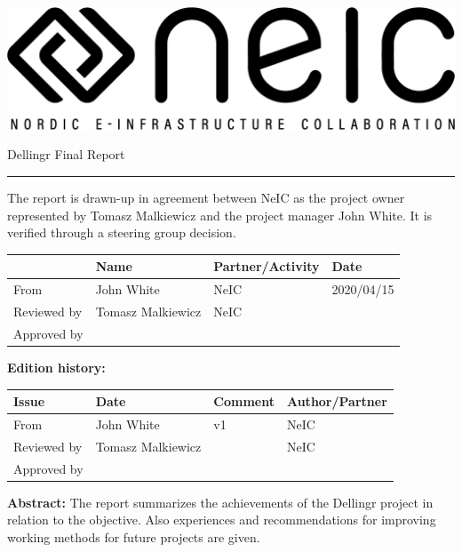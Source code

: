 \documentclass{article}
\newcommand{\dell}{Dellingr\xspace}
\begin{document}
\begin{center}
\includegraphics[width=\textwidth]{neic_logo_large.png}
\end{center}

\vspace{0.5in}
{\Huge  \dell Final Report} \hrule
\vspace{0.5in}

\noindent
{\large

{The report is drawn-up in agreement between NeIC as the project owner represented by Tomasz Malkiewicz and the project manager John White. 
It is verified through a steering group decision.
}
}

\begin{center}
\begin{tabular}{|l| l| l| l|} \hline

& Name
& Partner/Activity
& Date \\ \hline
From & 
John White &
NeIC & 
2020/04/15 \\ \hline
Reviewed by &
Tomasz Malkiewicz & 
NeIC & 
\\ \hline
Approved by &
 & 
 & 
\\ \hline
\end{tabular}
\end{center}

{\bf \large Edition history:}

\begin{center}
\begin{tabular}{|l| l| l| l|} \hline
Issue
& Date
& Comment
& Author/Partner \\ \hline
From & 
John White &
 v1 & 
 NeIC \\ \hline
Reviewed by &
Tomasz Malkiewicz & 
& 
NeIC \\ \hline
Approved by &
 & 
 & 
\\ \hline
\end{tabular}
\end{center}

{\bf \large Abstract:}
\noindent
{The report summarizes the achievements of the \dell project in relation to the objective. Also  experiences and recommendations for improving working methods for future projects are given.}
\end{document}
